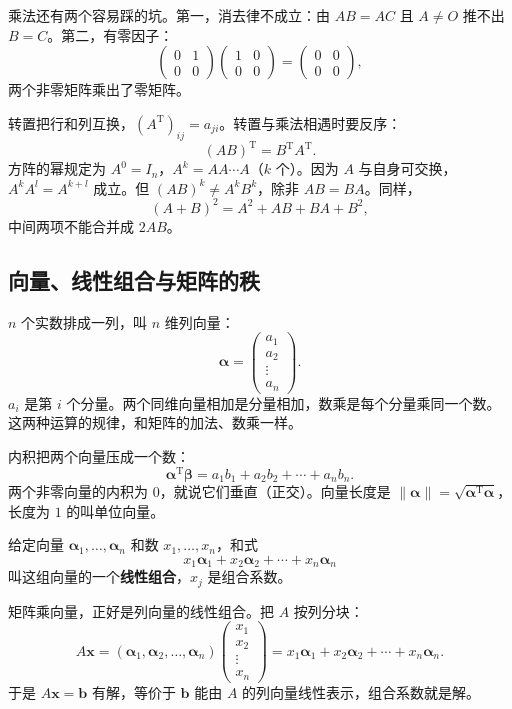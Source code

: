 乘法还有两个容易踩的坑。第一，消去律不成立：由 \(AB=AC\) 且 \(A\ne O\) 推不出 \(B=C\)。第二，有零因子：
\[
\begin{pmatrix}0&1\\0&0\end{pmatrix}
\begin{pmatrix}1&0\\0&0\end{pmatrix}
=\begin{pmatrix}0&0\\0&0\end{pmatrix},
\]
两个非零矩阵乘出了零矩阵。

转置把行和列互换，\((A^{\mathrm T})_{ij}=a_{ji}\)。转置与乘法相遇时要反序：
\[
(AB)^{\mathrm T}=B^{\mathrm T}A^{\mathrm T}.
\]
方阵的幂规定为 \(A^0=I_n\)，\(A^k=AA\cdots A\)（\(k\) 个）。因为 \(A\) 与自身可交换，\(A^kA^l=A^{k+l}\) 成立。但 \((AB)^k\ne A^kB^k\)，除非 \(AB=BA\)。同样，
\[
(A+B)^2=A^2+AB+BA+B^2,
\]
中间两项不能合并成 \(2AB\)。

\subsection{向量、线性组合与矩阵的秩}

\(n\) 个实数排成一列，叫 \(n\) 维列向量：
\[
\boldsymbol\alpha=\begin{pmatrix}a_1\\a_2\\\vdots\\a_n\end{pmatrix}.
\]
\(a_i\) 是第 \(i\) 个分量。两个同维向量相加是分量相加，数乘是每个分量乘同一个数。这两种运算的规律，和矩阵的加法、数乘一样。

内积把两个向量压成一个数：
\[
\boldsymbol\alpha^{\mathrm T}\boldsymbol\beta
=a_1b_1+a_2b_2+\cdots+a_nb_n.
\]
两个非零向量的内积为 \(0\)，就说它们垂直（正交）。向量长度是 \(\|\boldsymbol\alpha\|=\sqrt{\boldsymbol\alpha^{\mathrm T}\boldsymbol\alpha}\)，长度为 \(1\) 的叫单位向量。

给定向量 \(\boldsymbol\alpha_1,\ldots,\boldsymbol\alpha_n\) 和数 \(x_1,\ldots,x_n\)，和式
\[
x_1\boldsymbol\alpha_1+x_2\boldsymbol\alpha_2+\cdots+x_n\boldsymbol\alpha_n
\]
叫这组向量的一个\textbf{线性组合}，\(x_j\) 是组合系数。

矩阵乘向量，正好是列向量的线性组合。把 \(A\) 按列分块：
\[
A\boldsymbol x=(\boldsymbol\alpha_1,\boldsymbol\alpha_2,\ldots,\boldsymbol\alpha_n)
\begin{pmatrix}x_1\\x_2\\\vdots\\x_n\end{pmatrix}
=x_1\boldsymbol\alpha_1+x_2\boldsymbol\alpha_2+\cdots+x_n\boldsymbol\alpha_n.
\]
于是 \(A\boldsymbol x=\boldsymbol b\) 有解，等价于 \(\boldsymbol b\) 能由 \(A\) 的列向量线性表示，组合系数就是解。

